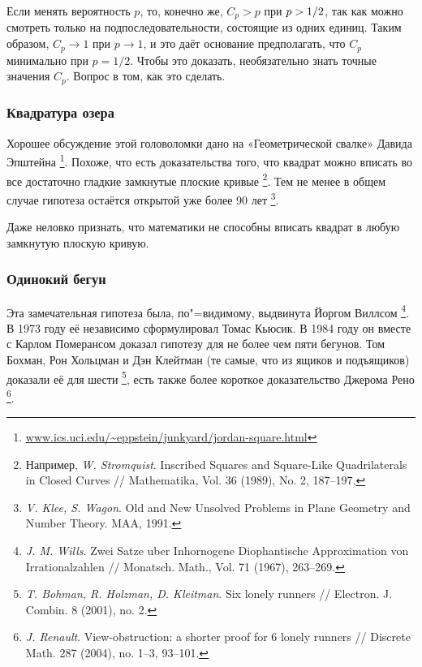 \documentclass[twoside]{book}
\begin{document}
Если менять вероятность $p$, то, конечно же, $C_p>p$ при $p \z> 1/2$, так как можно смотреть только на подпоследовательности, состоящие из одних единиц.
Таким образом, $C_p\to 1$ при $p\to 1$, и это даёт основание предполагать, что $C_p$ минимально при $p=1/2$.
Чтобы это доказать, необязательно знать точные значения $C_p$.
Вопрос в том, как это сделать.

\subsubsection*{Квадратура озера}

Хорошее обсуждение этой головоломки дано на «Геометрической свалке» Давида Эпштейна%
\footnote{\href{http://www.ics.uci.edu/~eppstein/junkyard/jordan-square.html}{\url{www.ics.uci.edu/~eppstein/junkyard/jordan-square.html}}}.
Похоже, что есть доказательства того, что квадрат можно вписать во все достаточно гладкие замкнутые плоские кривые%
\footnote{Например, \emph{W. Stromquist}. Inscribed Squares and Square-Like Quadrilaterals in Closed Curves /\!/ {Mathematika}, Vol. 36 (1989), No. 2, 187--197.}.
Тем не менее в общем случае гипотеза остаётся открытой уже более 90 лет%
\footnote{\emph{V. Klee, S. Wagon}. {Old and New Unsolved Problems in Plane Geometry and Number Theory.} MAA, 1991.}.

\medskip

Даже неловко признать, что математики не способны вписать квадрат в любую замкнутую плоскую кривую.

\subsubsection*{Одинокий бегун}

Эта замечательная гипотеза была, по"=видимому, выдвинута Йоргом Виллсом%
\footnote{\emph{J. M. Wills}. Zwei Satze uber Inhornogene Diophantische Approximation von Irrational\-zahlen /\!/ {Monatsch. Math.}, Vol. 71 (1967), 263--269.}.
В 1973 году её независимо сформулировал Томас Кьюсик.
В 1984 году он вместе с Карлом Померансом доказал гипотезу для не более чем пяти бегунов.
Том Бохман, Рон Хольцман и Дэн Клейтман (те самые, что из ящиков и подъящиков) доказали её для шести%
\footnote{\emph{T. Bohman, R. Holzman, D. Kleitman}.
Six lonely runners /\!/ {Electron. J. Combin.} 8 (2001), no. 2.
},
есть также более короткое доказательство Джерома Рено%
\footnote{\emph{J. Renault}. View-obstruction: a shorter proof for 6 lonely runners /\!/ {Discrete Math.} 287 (2004), no. 1--3, 93--101.}.
\end{document}
